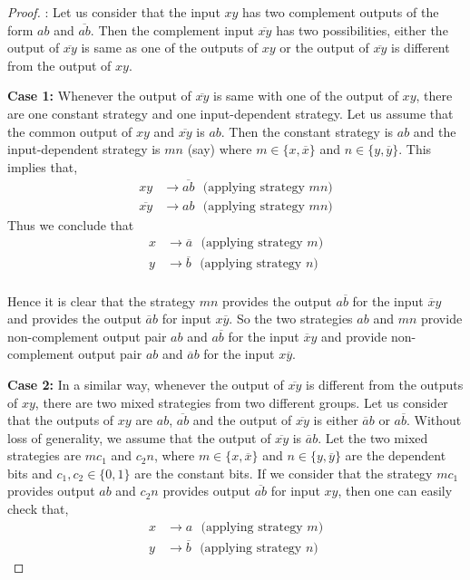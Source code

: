 \documentclass[]{svjour3}
\begin{document}
\begin{proof}
: Let us consider that the input $xy$ has two complement outputs of the form $ab$ and $\overline{ab}$. Then the complement input $\overline{xy}$ has two possibilities, either the output of $\overline{xy}$ is same as one of the outputs of $xy$ or the output of $\overline{xy}$ is different from the output of $xy$.

\textbf{Case 1:} Whenever the output of $\overline{xy}$ is same with one of the output of $xy$, there are one constant strategy and one input-dependent strategy. Let us assume that the common output of $xy$ and $\overline{xy}$ is $ab$. Then the constant strategy is $ab$ and the input-dependent strategy is $mn$ (say) where $m \in \{x, \overline{x}\}$ and $n \in \{y, \overline{y}\}$. This implies that,
\begin{align*}
xy &\rightarrow \overline{ab} ~~~\text{(applying strategy $mn$)}\\
\overline{xy} &\rightarrow ab ~~~\text{(applying strategy $mn$)}
\end{align*}
Thus we conclude that
\begin{align*}
x &\rightarrow \overline{a}~~~\text{(applying strategy  $m$)}\\
y &\rightarrow \overline{b}~~~\text{(applying strategy $n$)}\\
\end{align*}

Hence it is clear that the strategy
$mn$ provides the output $a\overline{b}$ for the input $\overline{x}y$ and provides the
output $\overline{a}b$ for input $x\overline{y}$. So the two strategies $ab$ and $mn$
provide non-complement output pair $ab$ and $a\overline{b}$ for the input $\overline{x}y$ and provide non-complement output pair $ab$ and $\overline{a}b$ for the input $x\overline{y}$.

\textbf{Case 2:} In a similar way, whenever the output of $\overline{xy}$ is different from the outputs of $xy$, there are two mixed strategies from two different groups. Let us consider that the outputs of $xy$ are $ab$, $\overline{ab}$ and the output of $\overline{xy}$ is either $\overline{a}b$ or $a\overline{b}$. Without loss of generality, we assume that the output of $\overline{xy}$ is $\overline{a}b$. Let the two mixed strategies are $mc_1$ and $c_2n$, where $m \in \{x, \overline{x}\}$ and $n \in \{y, \overline{y}\}$ are the dependent bits and $c_1, c_2 \in \{0, 1\}$ are the constant bits. If we consider that the strategy $mc_1$ provides output $ab$ and $c_2n$ provides output $\overline{ab}$ for input $xy$, then one can easily check that,
\begin{align*}
x &\rightarrow a~~~\text{(applying strategy $m$)}\\
y &\rightarrow \overline{b}~~~\text{(applying strategy $n$)}
\end{align*}


\end{proof}
\end{document}
